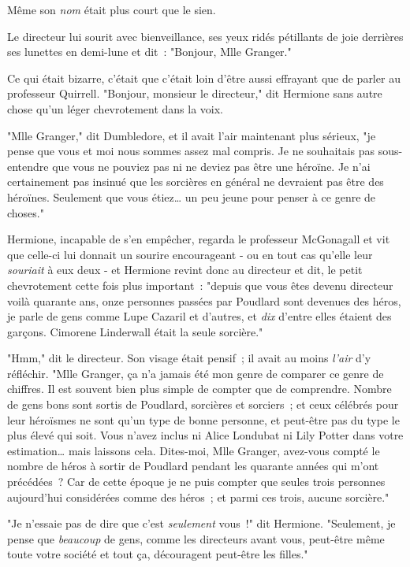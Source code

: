 Même son \emph{nom} était plus court que le sien.

Le directeur lui sourit avec bienveillance, ses yeux ridés pétillants de joie derrières ses lunettes en demi-lune et dit~: "Bonjour, Mlle Granger."

Ce qui était bizarre, c'était que c'était loin d'être aussi effrayant que de parler au professeur Quirrell. "Bonjour, monsieur le directeur," dit Hermione sans autre chose qu'un léger chevrotement dans la voix.

"Mlle Granger," dit Dumbledore, et il avait l'air maintenant plus sérieux, "je pense que vous et moi nous sommes assez mal compris. Je ne souhaitais pas sous-entendre que vous ne pouviez pas ni ne deviez pas être une héroïne. Je n'ai certainement pas insinué que les sorcières en général ne devraient pas être des héroïnes. Seulement que vous étiez… un peu jeune pour penser à ce genre de choses."

Hermione, incapable de s'en empêcher, regarda le professeur McGonagall et vit que celle-ci lui donnait un sourire encourageant - ou en tout cas qu'elle leur \emph{souriait} à eux deux - et Hermione revint donc au directeur et dit, le petit chevrotement cette fois plus important~: "depuis que vous êtes devenu directeur voilà quarante ans, onze personnes passées par Poudlard sont devenues des héros, je parle de gens comme Lupe Cazaril et d'autres, et \emph{dix} d'entre elles étaient des garçons. Cimorene Linderwall était la seule sorcière."

"Hmm," dit le directeur. Son visage était pensif~; il avait au moins \emph{l'air} d'y réfléchir. "Mlle Granger, ça n'a jamais été mon genre de comparer ce genre de chiffres. Il est souvent bien plus simple de compter que de comprendre. Nombre de gens bons sont sortis de Poudlard, sorcières et sorciers~; et ceux célébrés pour leur héroïsmes ne sont qu'un type de bonne personne, et peut-être pas du type le plus élevé qui soit. Vous n'avez inclus ni Alice Londubat ni Lily Potter dans votre estimation… mais laissons cela. Dites-moi, Mlle Granger, avez-vous compté le nombre de héros à sortir de Poudlard pendant les quarante années qui m'ont précédées~? Car de cette époque je ne puis compter que seules trois personnes aujourd'hui considérées comme des héros~; et parmi ces trois, aucune sorcière."

"Je n'essaie pas de dire que c'est \emph{seulement} vous~!" dit Hermione. "Seulement, je pense que \emph{beaucoup} de gens, comme les directeurs avant vous, peut-être même toute votre société et tout ça, découragent peut-être les filles."

